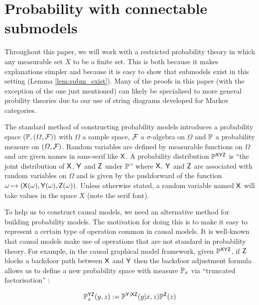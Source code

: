 

\section{Probability with connectable submodels}

Throughout this paper, we will work with a restricted probability theory in which any measurable set $X$ to be a finite set. This is both because it makes explanations simpler and because it is easy to show that submodels exist in this setting (Lemma \ref{lem:subm_exist}). Many of the proofs in this paper (with the exception of the one just mentioned) can likely be specialised to more general probility theories due to our use of string diagrams developed for Markov categories.

The standard method of constructing probability models introduces a probability space $(\mathbb{P},(\Omega,\mathcal{F}))$ with $\Omega$ a sample space, $\mathcal{F}$ a $\sigma$-algebra on $\Omega$ and $\mathbb{P}$ a probability measure on $(\Omega,\mathcal{F})$. Random variables are defined by measurable functions on $\Omega$ and are given names in sans-serif like $\mathsf{X}$. A probability distribution $\mathbb{P}^{\mathsf{XYZ}}$ is ``the joint distribution of $\mathsf{X}$, $\mathsf{Y}$ and $\mathsf{Z}$ under $\mathbb{P}$'' where $\mathsf{X},$ $\mathsf{Y}$ and $\mathsf{Z}$ are associated with random variables on $\Omega$ and is given by the pushforward of the function $\omega\mapsto (\mathsf{X}(\omega),\mathsf{Y}(\omega),\mathsf{Z}(\omega))$. Unless otherwise stated, a random variable named $\mathsf{X}$ will take values in the space $X$ (note the serif font).

To help us to construct causal models, we need an alternative method for building probability models. The motivation for doing this is to make it easy to represent a certain type of operation common in causal models. It is well-known that causal models make use of operations that are not standard in probability theory. For example, in the causal graphical model framework, given $\mathbb{P}^{\mathsf{XYZ}}$, if $\mathsf{Z}$ blocks a backdoor path between $\mathsf{X}$ and $\mathsf{Y}$ then the backdoor adjustment formula allows us to define a new probability space with measure $\mathbb{P}_x$ via ``truncated factorisation'' \citep[page ~24]{pearl_causality:_2009}:

\begin{align}
	\mathbb{P}^{\mathsf{YZ}}_{x}(y,z):=\mathbb{P}^{\mathsf{Y|XZ}}(y|x,z)\mathbb{P}^{\mathsf{Z}}(z)\label{eq:truncated_fac}
\end{align}

